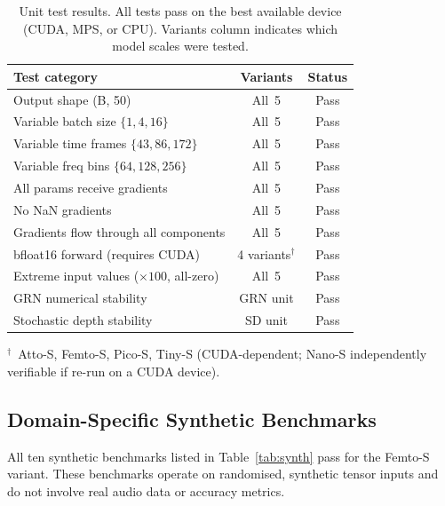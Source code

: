 \documentclass{article}
\newcommand{\passmark}{\textnormal{Pass}}
\begin{document}
\begin{table}[h]
  \centering
  \caption{Unit test results. All tests pass on the best available device
  (CUDA, MPS, or CPU). Variants column indicates which model scales were
  tested.}
  \label{tab:unit_tests}
  \small
  \begin{tabular}{lcc}
  \toprule
  \textbf{Test category} & \textbf{Variants} & \textbf{Status} \\
  \midrule
  Output shape (B, 50) & All~5 & \passmark \\
  Variable batch size $\{1, 4, 16\}$ & All~5 & \passmark \\
  Variable time frames $\{43, 86, 172\}$ & All~5 & \passmark \\
  Variable freq bins $\{64, 128, 256\}$ & All~5 & \passmark \\
  All params receive gradients & All~5 & \passmark \\
  No NaN gradients & All~5 & \passmark \\
  Gradients flow through all components & All~5 & \passmark \\
  bfloat16 forward (requires CUDA) & 4 variants$^\dagger$ & \passmark \\
  Extreme input values ($\times 100$, all-zero) & All~5 & \passmark \\
  GRN numerical stability & GRN unit & \passmark \\
  Stochastic depth stability & SD unit & \passmark \\
  \bottomrule
  \end{tabular}

  \vspace{4pt}
  $^\dagger$\ Atto-S, Femto-S, Pico-S, Tiny-S (CUDA-dependent; Nano-S
  independently verifiable if re-run on a CUDA device).
\end{table}

\subsection{Domain-Specific Synthetic Benchmarks}

All ten synthetic benchmarks listed in Table~\ref{tab:synth} pass for the
Femto-S variant. These benchmarks operate on randomised, synthetic tensor
inputs and do not involve real audio data or accuracy metrics.
\end{document}
